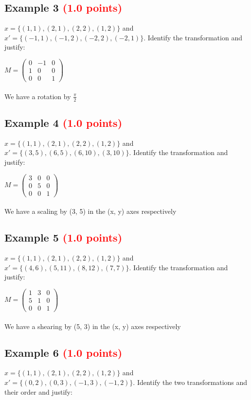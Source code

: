 \documentclass[answers]{exam}
\newcommand{\mypoints}[1]{\textcolor{red}{(#1 points)}}
\begin{document}
\subsection{Example 3 \mypoints{1.0}}
$x = \{(1,1), (2,1), (2,2), (1,2)\}$ and $x' = \{(-1,1), (-1,2), (-2,2), (-2,1)\}$. Identify the transformation and justify:
\begin{solution}
$
M = \begin{pmatrix}
0 & -1 & 0\\
1 & 0 & 0\\
0 & 0 & 1
\end{pmatrix}
$
\\\\
We have a rotation by $\frac{\pi}{2}$
\end{solution}

\subsection{Example 4 \mypoints{1.0}}
$x = \{(1,1), (2,1), (2,2), (1,2)\}$ and $x' = \{(3,5), (6,5), (6,10), (3,10)\}$. Identify the transformation and justify:
\begin{solution}
$
M = \begin{pmatrix}
3 & 0 & 0\\
0 & 5 & 0\\
0 & 0 & 1
\end{pmatrix}
$
\\\\
We have a scaling by (3, 5) in the (x, y) axes respectively
\end{solution}

\subsection{Example 5 \mypoints{1.0}}
$x = \{(1,1), (2,1), (2,2), (1,2)\}$ and $x' = \{(4,6), (5,11), (8,12), (7,7)\}$. Identify the transformation and justify:
\begin{solution}
$
M = \begin{pmatrix}
1 & 3 & 0\\
5 & 1 & 0\\
0 & 0 & 1
\end{pmatrix}
$
\\\\
We have a shearing by (5, 3) in the (x, y) axes respectively
\end{solution}

\subsection{Example 6 \mypoints{1.0}}
$x = \{(1,1), (2,1), (2,2), (1,2)\}$ and $x' = \{(0,2), (0,3), (-1,3), (-1,2)\}$. Identify the two transformations and their order and justify:
\end{document}
